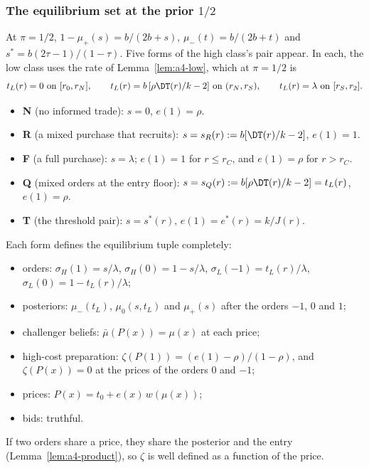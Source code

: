 \subsubsection*{The equilibrium set at the prior \(1/2\)}

At \(\pi=1/2\), \(1-\mu_+(s)=b/(2b+s)\), \(\mu_-(t)=b/(2b+t)\) and \(s^*=b(2\tau-1)/(1-\tau)\). Five forms of the
high class's pair appear. In each, the low class uses the rate of Lemma~\ref{lem:a4-low}, which at \(\pi=1/2\) is
\[
t_L(r)=0\ \text{on}\ [r_0,r_N],\qquad t_L(r)=b\,[\rho\DT(r)/k-2]\ \text{on}\ (r_N,r_S),\qquad
t_L(r)=\lambda\ \text{on}\ [r_S,r_2].
\]
\begin{itemize}[leftmargin=2em]
\item \textbf{N} (no informed trade): \(s=0\), \(e(1)=\rho\).
\item \textbf{R} (a mixed purchase that recruits): \(s=s_R(r):=b[\DT(r)/k-2]\), \(e(1)=1\).
\item \textbf{F} (a full purchase): \(s=\lambda\); \(e(1)=1\) for \(r\le r_C\), and \(e(1)=\rho\) for \(r>r_C\).
\item \textbf{Q} (mixed orders at the entry floor): \(s=s_Q(r):=b[\rho\DT(r)/k-2]=t_L(r)\), \(e(1)=\rho\).
\item \textbf{T} (the threshold pair): \(s=s^*(r)\), \(e(1)=e^*(r)=k/J(r)\).
\end{itemize}
Each form defines the equilibrium tuple completely:
\begin{itemize}[leftmargin=2em]
\item orders: \(\sigma_H(1)=s/\lambda\), \(\sigma_H(0)=1-s/\lambda\), \(\sigma_L(-1)=t_L(r)/\lambda\),
\(\sigma_L(0)=1-t_L(r)/\lambda\);
\item posteriors: \(\mu_-(t_L)\), \(\mu_0(s,t_L)\) and \(\mu_+(s)\) after the orders \(-1\), \(0\) and \(1\);
\item challenger beliefs: \(\bar\mu(P(x))=\mu(x)\) at each price;
\item high-cost preparation: \(\zeta(P(1))=(e(1)-\rho)/(1-\rho)\), and \(\zeta(P(x))=0\) at the prices of the
orders \(0\) and \(-1\);
\item prices: \(P(x)=t_0+e(x)\,w(\mu(x))\);
\item bids: truthful.
\end{itemize}
If two orders share a price, they share the posterior and the entry (Lemma~\ref{lem:a4-product}), so \(\zeta\) is
well defined as a function of the price.


